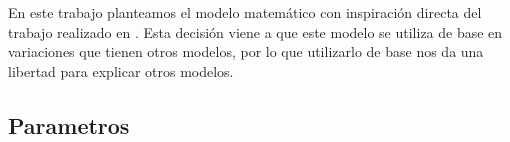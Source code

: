 
En este trabajo planteamos el modelo matemático con inspiración directa del trabajo realizado en \cite{Murray2015Flying}. Esta decisión viene a que este modelo se utiliza de base en variaciones que tienen otros modelos, por lo que utilizarlo de base nos da una libertad para explicar otros modelos.

\subsection{Parametros}

